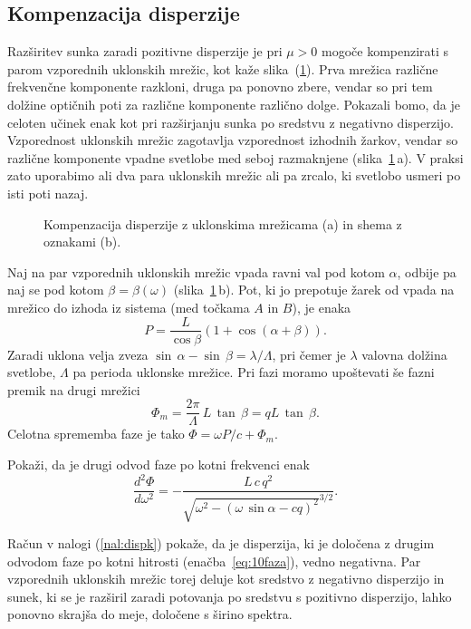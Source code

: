 \subsection*{Kompenzacija disperzije}
\label{kompdisp}
Razširitev sunka zaradi pozitivne disperzije je pri $\mu > 0$ mogoče kompenzirati
s parom vzporednih uklonskih mrežic, kot kaže slika~(\ref{fig:comp}).
Prva mrežica različne frekvenčne komponente razkloni, druga pa ponovno
zbere, vendar so pri tem dolžine optičnih poti za različne komponente različno dolge.
Pokazali bomo, da je celoten učinek enak kot pri razširjanju sunka po sredstvu z negativno
disperzijo. Vzporednost uklonskih mrežic zagotavlja vzporednost izhodnih žarkov,
vendar so različne komponente vpadne svetlobe med seboj razmaknjene (slika~\ref{fig:comp}\,a).
V praksi zato uporabimo ali dva para uklonskih mrežic ali pa 
zrcalo, ki svetlobo usmeri po isti poti nazaj. 
\begin{figure}[h]
\centering
\def\svgwidth{120truemm} 

\caption{Kompenzacija disperzije z uklonskima mrežicama (a) in shema z
oznakami (b).}
\label{fig:comp}
\end{figure}

Naj na par vzporednih uklonskih mrežic vpada ravni val pod kotom $\alpha$, odbije
pa naj se pod kotom $\beta = \beta(\omega)$ (slika~\ref{fig:comp}\,b). 
Pot, ki jo prepotuje žarek od vpada na mrežico 
do izhoda iz sistema (med točkama $A$ in $B$), je enaka 
\begin{equation}
P = \frac{L}{\cos\beta} \left(1+\cos(\alpha + \beta)\right).
\end{equation}
Zaradi uklona velja zveza $\sin\,\alpha - \sin\,\beta = \lambda/\Lambda$,
pri čemer je $\lambda$ valovna dolžina svetlobe, $\Lambda$ pa perioda uklonske mrežice. 
Pri fazi moramo upoštevati še fazni premik na drugi mrežici
\begin{equation}
\Phi_m=\frac{2\pi}{\Lambda} \, L \, \tan\,\beta = q L \,\tan\,\beta.
\end{equation}
Celotna sprememba faze je tako $\Phi = \omega P/c + \Phi_m$.

\begin{definition}
\label{nal:dispk}
Pokaži, da je drugi odvod faze po kotni frekvenci enak
\begin{equation}
\frac{d^2 \Phi}{d \omega^2} = - \frac{L\, c\, q^2}
{\sqrt{\omega^2 - (\omega\, \sin\alpha - cq)^2}^{3/2}}.
\label{eq:10faza}
\end{equation}
\end{definition}
Račun v nalogi (\ref{nal:dispk})
pokaže, da je disperzija, ki je določena z drugim odvodom faze po kotni hitrosti 
(enačba~\ref{eq:10faza}), vedno negativna. Par vzporednih uklonskih mrežic
torej deluje kot sredstvo
z negativno disperzijo in sunek, ki se je razširil zaradi potovanja
po sredstvu s pozitivno disperzijo, lahko ponovno skrajša do meje,
določene s širino spektra. 

